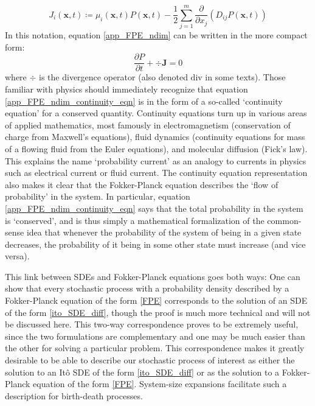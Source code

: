 \begin{equation*}
	J_i(\mathbf{x},t) \coloneqq \mu_i(\mathbf{x},t)P(\mathbf{x},t) - \frac{1}{2}\sum\limits_{j=1}^{m}\frac{\partial}{\partial x_j}\left(D_{ij}P(\mathbf{x},t)\right)
\end{equation*}
In this notation, equation \eqref{app_FPE_ndim} can be written in the more compact form:
\begin{equation}
	\label{app_FPE_ndim_continuity_eqn}
	\frac{\partial P}{\partial t}  + \div{\mathbf{J}} = 0
\end{equation}
where $\div$ is the divergence operator (also denoted $\mathrm{div}$ in some texts). Those familiar with physics should immediately recognize that equation \eqref{app_FPE_ndim_continuity_eqn} is in the form of a so-called `continuity equation' for a conserved quantity. Continuity equations turn up in various areas of applied mathematics, most famously in electromagnetism (conservation of charge from Maxwell's equations), fluid dynamics (continuity equations for mass of a flowing fluid from the Euler equations), and molecular diffusion (Fick's law). This explains the name `probability current' as an analogy to currents in physics such as electrical current or fluid current. The continuity equation representation also  makes it clear that the Fokker-Planck equation describes the `flow of probability' in the system. In particular, equation \eqref{app_FPE_ndim_continuity_eqn} says that the total probability in the system is `conserved', and is thus simply a mathematical formalization of the common-sense idea that whenever the probability of the system of being in a given state decreases, the probability of it being in some other state must increase (and vice versa).


This link between SDEs and Fokker-Planck equations goes both ways: One can show that every stochastic process with a probability density described by a Fokker-Planck equation of the form \eqref{FPE} corresponds to the solution of an SDE of the form \eqref{ito_SDE_diff}, though the proof is much more technical and will not be discussed here. This two-way correspondence proves to be extremely useful, since the two formulations are complementary and one may be much easier than the other for solving a particular problem. This correspondence makes it greatly desirable to be able to describe our stochastic process of interest as either the solution to an It\^o SDE of the form \eqref{ito_SDE_diff} or as the solution to a Fokker-Planck equation of the form \eqref{FPE}. System-size expansions facilitate such a description for birth-death processes.

